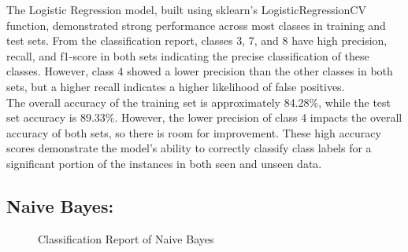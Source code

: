 \documentclass[11pt, letterpaper]{article}
\begin{document}
    \noindent The Logistic Regression model, built using sklearn’s LogisticRegressionCV function, demonstrated strong performance across most classes in training and test sets. From the classification report, classes 3, 7, and 8 have high precision, recall, and f1-score in both sets indicating the precise classification of these classes. However, class 4 showed a lower precision than the other classes in both sets, but a higher recall indicates a higher likelihood of false positives.\\
    
    \noindent The overall accuracy of the training set is approximately 84.28\%, while the test set accuracy is 89.33\%. However, the lower precision of class 4 impacts the overall accuracy of both sets, so there is room for improvement. These high accuracy scores demonstrate the model’s ability to correctly classify class labels for a significant portion of the instances in both seen and unseen data. 
    
    \noindent\subsection*{Naive Bayes:}

    \begin{figure}[H]
        \centering
        \qquad
        \caption{Classification Report of Naive Bayes}
        \label{fig:class-report-nb}
    \end{figure}
\end{document}
